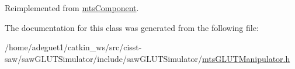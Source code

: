 Reimplemented from \hyperlink{classmts_component_aaf28f0262b44eb6866e10089a02fa6e4}{mts\-Component}.



The documentation for this class was generated from the following file\-:\begin{DoxyCompactItemize}
\item 
/home/adeguet1/catkin\-\_\-ws/src/cisst-\/saw/saw\-G\-L\-U\-T\-Simulator/include/saw\-G\-L\-U\-T\-Simulator/\hyperlink{mts_g_l_u_t_manipulator_8h}{mts\-G\-L\-U\-T\-Manipulator.\-h}\end{DoxyCompactItemize}
